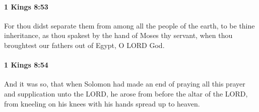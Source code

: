 		\paragraph{1 Kings 8:53} %
			\label{1KINGS-8-53}

			For thou didst separate them from among all the people of the earth, to be thine inheritance, as thou spakest by the hand of Moses thy servant, when thou broughtest our fathers out of Egypt, O LORD God.


		\paragraph{1 Kings 8:54} %
			\label{1KINGS-8-54}

			And it was so, that when Solomon had made an end of praying all this prayer and supplication unto the LORD, he arose from before the altar of the LORD, from kneeling on his knees with his hands spread up to heaven.


